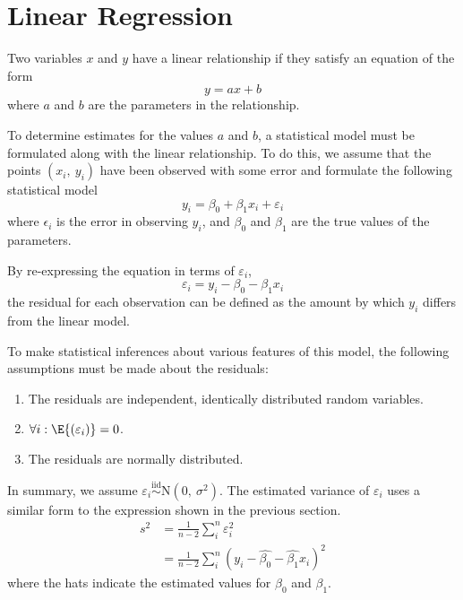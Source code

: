 \documentclass{article}
\begin{document}
\section{Linear Regression}
\begin{definition}
    Two variables $x$ and $y$ have a linear relationship if they satisfy an equation of the form
    \begin{equation*}
        y = a x + b
    \end{equation*}
    where $a$ and $b$ are the parameters in the relationship.
\end{definition}
To determine estimates for the values $a$ and $b$, a statistical model must be formulated along with the linear relationship.
To do this, we assume that the points $\left( x_i,\: y_i \right)$ have been observed with some error and formulate the following statistical model
\begin{equation*}
    y_i = \beta_0 + \beta_1 x_i + \varepsilon_i
\end{equation*}
where $\epsilon_i$ is the error in observing $y_i$, and $\beta_0$ and $\beta_1$ are the true values of the parameters.
\begin{definition}[Residual]
    By re-expressing the equation in terms of $\varepsilon_i$,
    \begin{equation*}
        \varepsilon_i = y_i - \beta_0 - \beta_1 x_i
    \end{equation*}
    the residual for each observation can be defined as the amount by which $y_i$ differs from the linear model.
\end{definition}
To make statistical inferences about various features of this model, the following assumptions must be made about the residuals:
\begin{enumerate}
    \item The residuals are independent, identically distributed random variables.
    \item $\forall i : \E{\left( \varepsilon_i \right)} = 0$.
    \item The residuals are normally distributed.
\end{enumerate}
In summary, we assume $\varepsilon_i \stackrel{\mathrm{iid}}{\sim} \mathrm{N}\left( 0,\: \sigma^2 \right)$.
The estimated variance of $\varepsilon_i$ uses a similar form to the expression shown in the previous section.
\begin{align*}
    s^2 & = \frac{1}{n- 2} \sum_i^n \varepsilon_i^2                                          \\
        & = \frac{1}{n- 2} \sum_i^n \left( y_i - \hat{\beta_0} - \hat{\beta_1} x_i \right)^2
\end{align*}
where the hats indicate the estimated values for $\beta_0$ and $\beta_1$.
\end{document}
